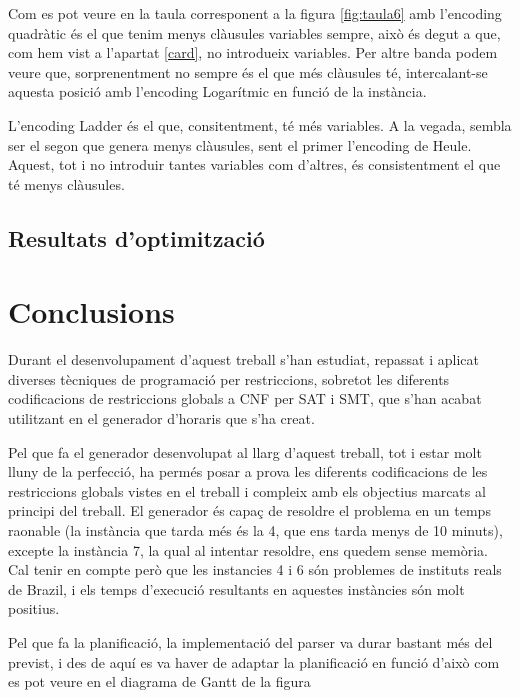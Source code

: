 \documentclass[11pt,a4paper,twoside]{report}
\begin{document}
  Com es pot veure en la taula corresponent a la figura \ref{fig:taula6} amb l'encoding quadràtic és el que tenim menys clàusules variables sempre, això és degut a que, com hem vist a l'apartat \ref{card}, no introdueix variables. 
  Per altre banda podem veure que, sorprenentment no sempre és el que més clàusules té, intercalant-se aquesta posició amb l'encoding Logarítmic en funció de la instància. 

  L'encoding Ladder és el que, consitentment, té més variables. 
  A la vegada, sembla ser el segon que genera menys clàusules, sent el primer l'encoding de Heule. Aquest, tot i no introduir tantes variables com d'altres, és consistentment el que té menys clàusules.

  \section{Resultats d'optimització}




  \chapter{Conclusions}

  Durant el desenvolupament d'aquest treball s'han estudiat, repassat i aplicat diverses tècniques de programació per restriccions, 
  sobretot les diferents codificacions de restriccions globals a CNF per SAT i SMT, que s'han acabat utilitzant en el generador d'horaris que s'ha creat. 

  Pel que fa el generador desenvolupat al llarg d'aquest treball, tot i estar molt lluny de la perfecció, 
  ha permés posar a prova les diferents codificacions de les restriccions globals vistes en el treball 
  i compleix amb els objectius marcats al principi del treball. El generador és capaç de resoldre el problema en un temps raonable (la instància que tarda més és la 4, que ens tarda menys de 10 minuts), 
  excepte la instància 7, la qual al intentar resoldre, ens quedem sense memòria. Cal tenir en compte però que les instancies 4 i 6 són problemes de instituts reals de Brazil, i els temps d'execució resultants en aquestes instàncies són molt positius.

  Pel que fa la planificació, la implementació del parser va durar bastant més del previst, i des de aquí es va haver de adaptar la planificació en funció d'això com es pot veure en el diagrama de Gantt de la figura \label{fig:Gantt2}
\end{document}
